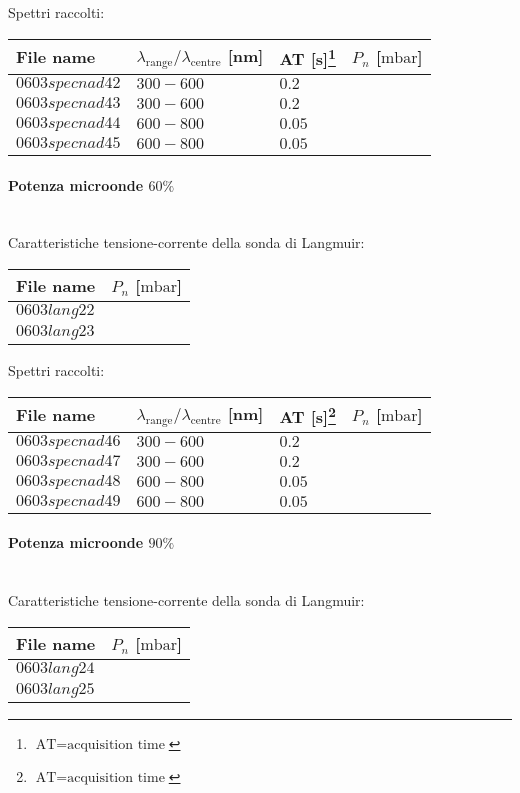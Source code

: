 Spettri raccolti:
\begin{center}
\begin{tabular}{p{3cm}p{4cm}p{2cm}p{3cm}}
\toprule
File name	&$\lambda_\text{range}\text{/}\lambda_\text{centre}$ [nm] 	&AT [s]\footnote{$\text{AT}=\text{acquisition time}$} &$P_n$ [$\si{\milli\bar}$]\\
\midrule
$0603specnad42$	&$300-600$	&$0.2$		&$  $\\
$0603specnad43$	&$300-600$	&$0.2$		&$  $\\
$0603specnad44$	&$600-800$	&$0.05$		&$  $\\
$0603specnad45$	&$600-800$	&$0.05$		&$  $\\
\bottomrule
\end{tabular}
\end{center}

\paragraph*{Potenza microonde $\text{60\%}$} ~\\
Caratteristiche tensione-corrente della sonda di Langmuir:
\begin{center}
\begin{tabular}{p{3cm}p{3cm}}
\toprule
File name	&$P_n$ [$\si{\milli\bar}$]\\
\midrule
$0603lang22$	&$  $\\
$0603lang23$	&$  $\\
\bottomrule
\end{tabular}
\end{center}

Spettri raccolti:
\begin{center}
\begin{tabular}{p{3cm}p{4cm}p{2cm}p{3cm}}
\toprule
File name	&$\lambda_\text{range}\text{/}\lambda_\text{centre}$ [nm] 	&AT [s]\footnote{$\text{AT}=\text{acquisition time}$} &$P_n$ [$\si{\milli\bar}$]\\
\midrule
$0603specnad46$	&$300-600$	&$0.2$		&$  $\\
$0603specnad47$	&$300-600$	&$0.2$		&$  $\\
$0603specnad48$	&$600-800$	&$0.05$		&$  $\\
$0603specnad49$	&$600-800$	&$0.05$		&$  $\\

\bottomrule
\end{tabular}
\end{center}

\paragraph*{Potenza microonde $\text{90\%}$} ~\\
Caratteristiche tensione-corrente della sonda di Langmuir:
\begin{center}
\begin{tabular}{p{3cm}p{3cm}}
\toprule
File name	&$P_n$ [$\si{\milli\bar}$]\\
\midrule
$0603lang24$	&$  $\\
$0603lang25$	&$  $\\
\bottomrule
\end{tabular}
\end{center}

